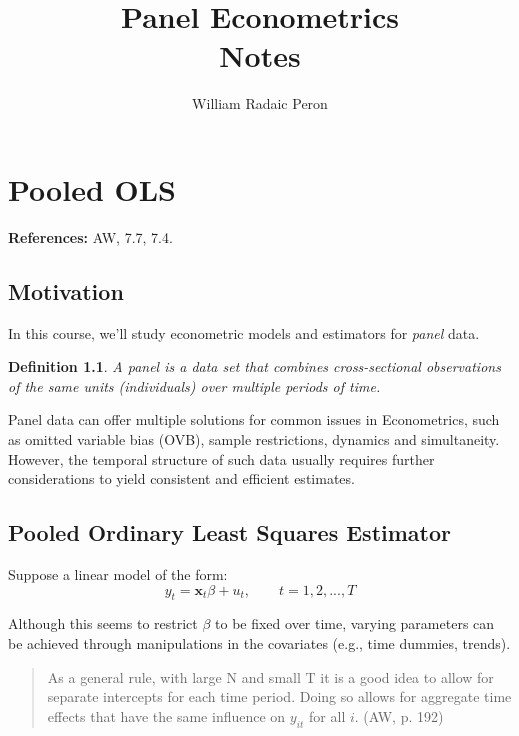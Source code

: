 \documentclass[11pt, a4paper]{report}
\title{\Huge \textbf{Panel Econometrics} \\ \LARGE Notes}
\author{\Large William Radaic Peron}
\affil{\Large EESP-FGV}
\theoremstyle{plain}
\theoremstyle{plain}
\newtheorem{defn}{Definition}[section]
\theoremstyle{remark}
\begin{document}
\setlength{\parindent}{0em}
\maketitle

\tableofcontents

\chapter{Pooled OLS}

\textbf{References:} AW, 7.7, 7.4.

\section{Motivation}

In this course, we'll study econometric models and estimators for \textit{panel} data.

\begin{defn} 
    A panel is a data set that combines cross-sectional observations of the same units (individuals) over multiple periods of time.
\end{defn}

Panel data can offer multiple solutions for common issues in Econometrics, such as omitted variable bias (OVB), sample restrictions, dynamics and simultaneity. However, the temporal structure of such data usually requires further considerations to yield consistent and efficient estimates.

\section{Pooled Ordinary Least Squares Estimator}

Suppose a linear model of the form: 
\begin{equation}
    y_t = \mathbf{x}_t \beta + u_t, \hspace{2em} t = 1,2,...,T
\end{equation} 

Although this seems to restrict $\beta$ to be fixed over time, varying parameters can be achieved through manipulations in the covariates (e.g., time dummies, trends).
\begin{quote}
    As a general rule, with large N and small T it is a good idea to allow for separate
intercepts for each time period. Doing so allows for aggregate time effects that have
the same influence on $y_{it}$ for all $i$. (AW, p. 192)
\end{quote}
\end{document}

